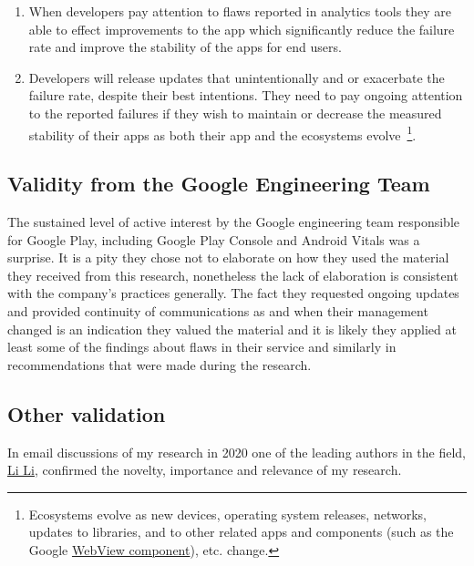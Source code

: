 \begin{enumerate}
    \item When developers pay attention to flaws reported in analytics tools they are able to effect improvements to the app which significantly reduce the failure rate and improve the stability of the apps for end users.
    \item Developers will release updates that unintentionally and or exacerbate the failure rate, despite their best intentions. They need to pay ongoing attention to the reported failures if they wish to maintain or decrease the measured stability of their apps as both their app and the ecosystems evolve~\footnote{Ecosystems evolve as new devices, operating system releases, networks, updates to libraries, and to other related apps and components (such as the Google \href{ection-webview-component}{WebView component}), etc. change.}.
\end{enumerate}

\subsection{Validity from the Google Engineering Team}
The sustained level of active interest by the Google engineering team responsible for Google Play, including Google Play Console and Android Vitals was a surprise. It is a pity they chose not to elaborate on how they used the material they received from this research, nonetheless the lack of elaboration is consistent with the company's practices generally. The fact they requested ongoing updates and provided continuity of communications as and when their management changed is an indication they valued the material and it is likely they applied at least some of the findings about flaws in their service and similarly in recommendations that were made during the research.

\subsection{Other validation}
In email discussions of my research in 2020 one of the leading authors in the field, \href{https://scholar.google.com/citations?user=zuUsFkgAAAAJ&hl=en&oi=sra}{Li Li}, confirmed the novelty, importance and relevance of my research.


